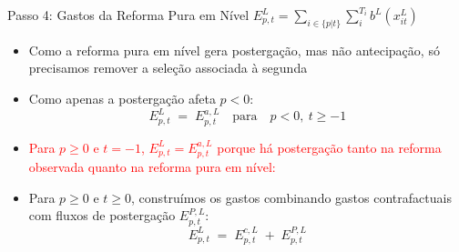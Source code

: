 \begin{frame}{Passo 4: Gastos da Reforma Pura em Nível $E^{L}_{p,t}=\sum_{i \in \{p|t\}}\sum_i^{T_i} b^L(x^L_{it})$}
\begin{itemize}
    \item Como a reforma pura em nível gera {postergação}, mas não {antecipação}, só precisamos remover a seleção associada à segunda
    
    \item Como apenas a postergação afeta $p<0$:
    \[
        {
        E^{L}_{p,t} \;=\; E^{a,L}_{p,t}
        }\quad \text{para}\quad p<0,\ t\geq -1
    \]
    \item \textcolor{red}{Para $p\geq 0$ e $t=-1$, $E^{L}_{p,t}=E^{a,L}_{p,t}$ porque há postergação tanto na reforma observada quanto na reforma pura em nível:}
    \item Para $p\geq 0$ e $t\geq 0$, construímos os gastos combinando gastos contrafactuais com fluxos de postergação $E^{P,L}_{p,t}$:
    \[
        {
        E^{L}_{p,t}
        \;=\;
        E^{c,L}_{p,t}
        \;+\;
        E^{P,L}_{p,t}
        }
    \]
\end{itemize}
\end{frame}


